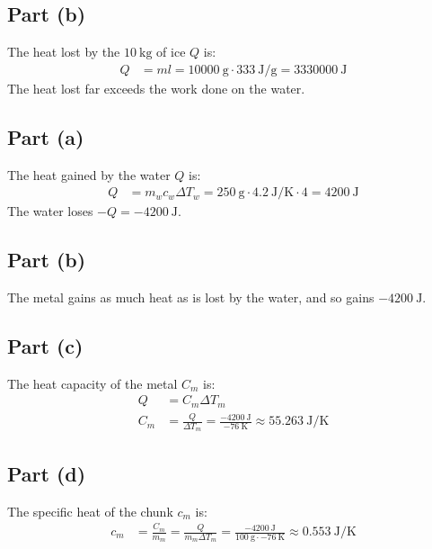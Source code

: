 \documentclass{article}
\begin{document}
\subsection*{Part (b)}
The heat lost by the $10~\unit{\kilo\gram}$ of ice $Q$ is:
\begin{equation}
    \begin{split}
        Q & = ml = 10000~\unit{\gram} \cdot 333~\unit{\joule\per\gram} = 3330000~\unit{\joule}
    \end{split}
\end{equation}
The heat lost far exceeds the work done on the water.

\clearpage

\subsection*{Part (a)}
The heat gained by the water $Q$ is:
\begin{equation}
    \begin{split}
        Q & = m_wc_w\Delta T_w = 250~\unit{\gram}\cdot 4.2~\unit{\joule\per\kelvin}\cdot 4 = 4200~\unit{\joule}
    \end{split}
\end{equation}
The water loses $-Q = -4200~\unit{\joule}$.
\subsection*{Part (b)}
The metal gains as much heat as is lost by the water, and so gains $-4200~\unit{\joule}$.
\subsection*{Part (c)}
The heat capacity of the metal $C_m$ is:
\begin{equation}
    \begin{split}
        Q & = C_m\Delta T_m \\
        C_m & = \frac{Q}{\Delta T_m} = \frac{-4200~\unit{\joule}}{-76~\unit{\kelvin}} \approx 55.263~\unit{\joule\per\kelvin}
    \end{split}
\end{equation}
\subsection*{Part (d)}
The specific heat of the chunk $c_m$ is:
\begin{equation}
    \begin{split}
        c_m & = \frac{C_m}{m_m} = \frac{Q}{m_m\Delta T_m} = \frac{-4200~\unit{\joule}}{100~\unit{\gram}\cdot -76~\unit{\kelvin}} \approx 0.553~\unit{\joule\per\kelvin}
    \end{split}
\end{equation}
\end{document}

